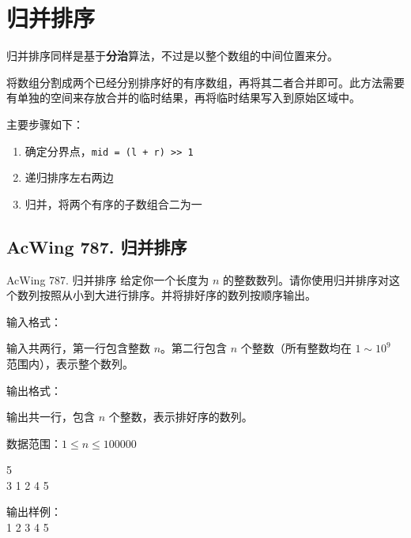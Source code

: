 \section{归并排序}
归并排序同样是基于\textbf{分治}算法，不过是以整个数组的中间位置来分。

将数组分割成两个已经分别排序好的有序数组，再将其二者合并即可。此方法需要有单独的空间来存放合并的临时结果，再将临时结果写入到原始区域中。

主要步骤如下：
\begin{enumerate}
  \item 确定分界点，\lstinline{mid = (l + r) >> 1}
  \item 递归排序左右两边
  \item 归并，将两个有序的子数组合二为一
\end{enumerate}

\subsection{AcWing 787. 归并排序}
\begin{titledbox}{AcWing 787. 归并排序}
    给定你一个长度为 $n$ 的整数数列。请你使用归并排序对这个数列按照从小到大进行排序。并将排好序的数列按顺序输出。
  
    输入格式：
  
    输入共两行，第一行包含整数 $n$。第二行包含 $n$ 个整数（所有整数均在 $1 \sim 10^9$ 范围内），表示整个数列。
  
    输出格式：
  
    输出共一行，包含 $n$ 个整数，表示排好序的数列。
  
    数据范围：$1 \le n \le 100000$
  
    \begin{inputblock}
        5 \\
        3 1 2 4 5
        \end{inputblock}%
        \begin{minipage}[t]{.5\textwidth}
        输出样例：\\
        1 2 3 4 5
    \end{minipage}
\end{titledbox}

